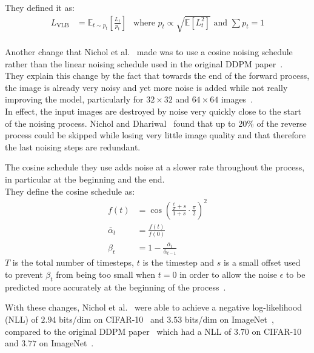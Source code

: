\documentclass[twoside]{article}
\numberwithin{equation}{section}
\numberwithin{figure}{section}
\begin{document}
They defined it as:
\begin{align}
  L_{\text{VLB}} &= \mathbb{E}_{t \sim p_t} \left[ \frac{L_t}{p_t} \right]
  &\text{where } p_t \propto \sqrt{\mathbb{E}\left[ L_t^2 \right]} \text{ and } \sum p_t = 1
\end{align}
\\
Another change that Nichol et al.~\cite{nichol2021improved} made was to use a cosine noising schedule rather than the linear noising schedule used in the original DDPM paper~\cite{ho2020denoising}. \\
They explain this change by the fact that towards the end of the forward process, the image is already very noisy and yet more noise is added while not really improving the model, particularly for $32 \times 32$ and $64 \times 64$ images~\cite{nichol2021improved}. \\
In effect, the input images are destroyed by noise very quickly close to the start of the noising process. Nichol and Dhariwal~\cite{nichol2021improved} found that up to 20\% of the reverse process could be skipped while losing very little image quality and that therefore the last noising steps are redundant. 

The cosine schedule they use adds noise at a slower rate throughout the process, in particular at the beginning and the end. \\
They define the cosine schedule as:
\begin{align}
  f(t) &= \cos \left( \frac{\frac{t}{T} + s}{1 + s} \cdot \frac{\pi}{2} \right)^2 \\
  \bar{\alpha}_t &= \frac{f(t)}{f(0)} \\
  \beta_t &= 1 - \frac{\bar{\alpha}_t}{\bar{\alpha}_{t-1}}
\end{align}
$T$ is the total number of timesteps, $t$ is the timestep and $s$ is a small offset used to prevent $\beta_t$ from being too small when $t = 0$ in order to allow the noise $\epsilon$ to be predicted more accurately at the beginning of the process~\cite{nichol2021improved}.

With these changes, Nichol et al.~\cite{nichol2021improved} were able to achieve a negative log-likelihood (NLL) of $2.94$ bits/dim on CIFAR-10~\cite{cifar10} and $3.53$ bits/dim on ImageNet~\cite{oord2016conditional}, compared to the original DDPM paper~\cite{ho2020denoising} which had a NLL of $3.70$ on CIFAR-10 and $3.77$ on ImageNet~\cite{nichol2021improved}.
\end{document}
